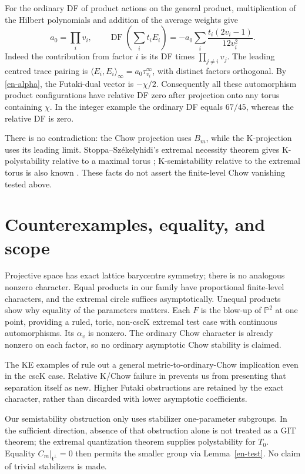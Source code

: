 \documentclass[12pt]{amsart}
\theoremstyle{definition}
\theoremstyle{remark}
\numberwithin{equation}{section}
\newcommand{\mP}{\mathbb{P}}
\DeclareMathOperator{\DF}{DF}
\begin{document}
For the ordinary DF of product actions on the general product, multiplication of the Hilbert polynomials and addition of the average weights give
\begin{equation}\label{en-productDF}
 a_0=\prod_i v_i,\qquad
 \DF\left(\sum_it_iE_i\right)
 =-a_0\sum_i\frac{t_i(2v_i-1)}{12v_i^2}.
\end{equation}
Indeed the contribution from factor $i$ is its DF times $\prod_{j\ne i}v_j$. The leading centred trace pairing is
$\langle E_i,E_i\rangle_\infty=a_0\tau_{v_i}^\infty$, with distinct factors orthogonal. By \eqref{en-alpha}, the Futaki-dual vector is $-\chi/2$. Consequently all these automorphism product configurations have relative DF zero after projection onto any torus containing $\chi$. In the integer example the ordinary DF equals $67/45$, whereas the relative DF is zero.

There is no contradiction: the Chow projection uses $B_m$, while the K-projection uses its leading limit. Stoppa--Székelyhidi's extremal necessity theorem gives K-polystability relative to a maximal torus \cite[Theorem 4]{en-SS}; K-semistability relative to the extremal torus is also known \cite[Theorem 1.3]{en-Has17}. These facts do not assert the finite-level Chow vanishing tested above.

\section{Counterexamples, equality, and scope}

Projective space has exact lattice barycentre symmetry; there is no analogous nonzero character. Equal products in our family have proportional finite-level characters, and the extremal circle suffices asymptotically. Unequal products show why equality of the parameters matters. Each $F$ is the blow-up of $\mP^2$ at one point, providing a ruled, toric, non-cscK extremal test case with continuous automorphisms. Its $\alpha_v$ is nonzero. The ordinary Chow character is already nonzero on each factor, so no ordinary asymptotic Chow stability is claimed.

The KE examples of \cite{en-OSY} rule out a general metric-to-ordinary-Chow implication even in the cscK case. Relative K/Chow failure in \cite{en-YZ} prevents us from presenting that separation itself as new. Higher Futaki obstructions are retained by the exact character, rather than discarded with lower asymptotic coefficients.

Our semistability obstruction only uses stabilizer one-parameter subgroups. In the sufficient direction, absence of that obstruction alone is not treated as a GIT theorem; the extremal quantization theorem supplies polystability for $T_0$. Equality $C_m|_{\mathfrak t^\perp}=0$ then permits the smaller group via Lemma~\ref{en-test}. No claim of trivial stabilizers is made.
\end{document}

